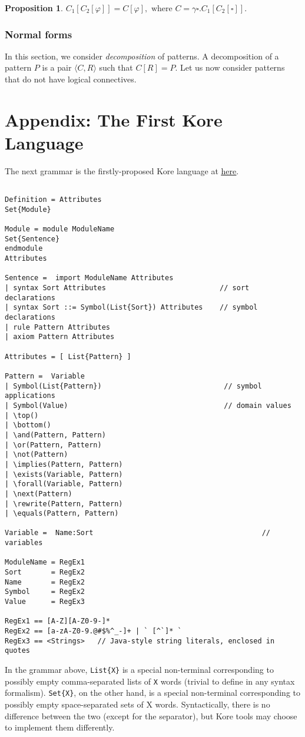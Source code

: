 \documentclass[UTF8]{article}
\newcounter{thmcounter}
\theoremstyle{plain}
\newtheorem{proposition}[thmcounter]{Proposition}
\theoremstyle{definition}
\theoremstyle{remark}
\begin{document}
\begin{proposition}
	$C_1[C_2[\varphi]] = C [\varphi], \text{ where } C = \gamma \square . C_1[C_2[\square]].$
\end{proposition}

\subsubsection{Normal forms}

In this section, we consider \emph{decomposition} of patterns. A decomposition of a pattern $P$ is a pair $\langle C, R \rangle $ such that $C[R] = P$. Let us now consider patterns that do not have logical connectives.


\section{Appendix: The First Kore Language}

The next grammar is the firstly-proposed Kore language at \href{https://github.com/kframework/kore/wiki/KORE-Language-Syntax}{\underline{here}}.

\begin{Verbatim}[fontsize=\small]

Definition = Attributes
Set{Module}

Module = module ModuleName
Set{Sentence}
endmodule
Attributes

Sentence =  import ModuleName Attributes
| syntax Sort Attributes                           // sort declarations
| syntax Sort ::= Symbol(List{Sort}) Attributes    // symbol declarations
| rule Pattern Attributes
| axiom Pattern Attributes

Attributes = [ List{Pattern} ]

Pattern =  Variable
| Symbol(List{Pattern})                             // symbol applications
| Symbol(Value)                                     // domain values
| \top()
| \bottom()
| \and(Pattern, Pattern)
| \or(Pattern, Pattern)
| \not(Pattern)
| \implies(Pattern, Pattern)
| \exists(Variable, Pattern)
| \forall(Variable, Pattern)
| \next(Pattern)
| \rewrite(Pattern, Pattern)
| \equals(Pattern, Pattern)

Variable =  Name:Sort                                        // variables

ModuleName = RegEx1
Sort       = RegEx2
Name       = RegEx2
Symbol     = RegEx2
Value      = RegEx3

RegEx1 == [A-Z][A-Z0-9-]*
RegEx2 == [a-zA-Z0-9.@#$%^_-]+ | ` [^`]* `
RegEx3 == <Strings>   // Java-style string literals, enclosed in quotes

\end{Verbatim}
In the grammar above, {\small\verb|List{X}|} is a special non-terminal corresponding to possibly empty comma-separated lists of {\small\verb|X|} words (trivial to define in any syntax formalism). {\small\verb|Set{X}|}, on the other hand, is a special non-terminal corresponding to possibly empty space-separated sets of X words. Syntactically, there is no difference between the two (except for the separator), but Kore tools may choose to implement them differently.
\end{document}
